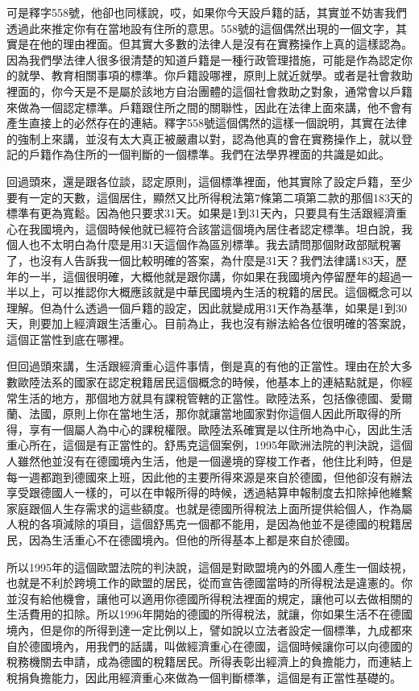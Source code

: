\documentclass[]{ctexbook}
\begin{document}
可是釋字558號，他卻也同樣說，哎，如果你今天設戶籍的話，其實並不妨害我們透過此來推定你有在當地設有住所的意思。558號的這個偶然出現的一個文字，其實是在他的理由裡面。但其實大多數的法律人是沒有在實務操作上真的這樣認為。因為我們學法律人很多很清楚的知道戶籍是一種行政管理措施，可能是作為認定你的就學、教育相關事項的標準。你戶籍設哪裡，原則上就近就學。或者是社會救助裡面的，你今天是不是屬於該地方自治團體的這個社會救助之對象，通常會以戶籍來做為一個認定標準。戶籍跟住所之間的關聯性，因此在法律上面來講，他不會有產生直接上的必然存在的連結。釋字558號這個偶然的這樣一個說明，其實在法律的強制上來講，並沒有太大真正被嚴肅以對，認為他真的會在實務操作上，就以登記的戶籍作為住所的一個判斷的一個標準。我們在法學界裡面的共識是如此。

回過頭來，還是跟各位談，認定原則，這個標準裡面，他其實除了設定戶籍，至少要有一定的天數，這個居住，顯然又比所得稅法第7條第二項第二款的那個183天的標準有更為寬鬆。因為他只要求31天。如果是1到31天內，只要具有生活跟經濟重心在我國境內，這個時候他就已經符合該當這個境內居住者認定標準。坦白說，我個人也不太明白為什麼是用31天這個作為區別標準。我去請問那個財政部賦稅署了，也沒有人告訴我一個比較明確的答案，為什麼是31天？我們法律講183天，歷年的一半，這個很明確，大概他就是跟你講，你如果在我國境內停留歷年的超過一半以上，可以推認你大概應該就是中華民國境內生活的稅籍的居民。這個概念可以理解。但為什么透過一個戶籍的設定，因此就變成用31天作為基準，如果是1到30天，則要加上經濟跟生活重心。目前為止，我也沒有辦法給各位很明確的答案說，這個正當性到底在哪裡。

但回過頭來講，生活跟經濟重心這件事情，倒是真的有他的正當性。理由在於大多數歐陸法系的國家在認定稅籍居民這個概念的時候，他基本上的連結點就是，你經常生活的地方，那個地方就具有課稅管轄的正當性。歐陸法系，包括像德國、愛爾蘭、法國，原則上你在當地生活，那你就讓當地國家對你這個人因此所取得的所得，享有一個屬人為中心的課稅權限。歐陸法系確實是以住所地為中心，因此生活重心所在，這個是有正當性的。舒馬克這個案例，1995年歐洲法院的判決說，這個人雖然他並沒有在德國境內生活，他是一個邊境的穿梭工作者，他住比利時，但是每一週都跑到德國來上班，因此他的主要所得來源是來自於德國，但他卻沒有辦法享受跟德國人一樣的，可以在申報所得的時候，透過結算申報制度去扣除掉他維繫家庭跟個人生存需求的這些額度。也就是德國所得稅法上面所提供給個人，作為屬人稅的各項減除的項目，這個舒馬克一個都不能用，是因為他並不是德國的稅籍居民，因為生活重心不在德國境內。但他的所得基本上都是來自於德國。

所以1995年的這個歐盟法院的判決說，這個是對歐盟境內的外國人產生一個歧視，也就是不利於跨境工作的歐盟的居民，從而宣告德國當時的所得稅法是違憲的。你並沒有給他機會，讓他可以適用你德國所得稅法裡面的規定，讓他可以去做相關的生活費用的扣除。所以1996年開始的德國的所得稅法，就讓，你如果生活不在德國境內，但是你的所得到達一定比例以上，譬如說以立法者設定一個標準，九成都來自於德國境內，用我們的話講，叫做經濟重心在德國，這個時候讓你可以向德國的稅務機關去申請，成為德國的稅籍居民。所得表彰出經濟上的負擔能力，而連結上稅捐負擔能力，因此用經濟重心來做為一個判斷標準，這個是有正當性基礎的。
\end{document}
